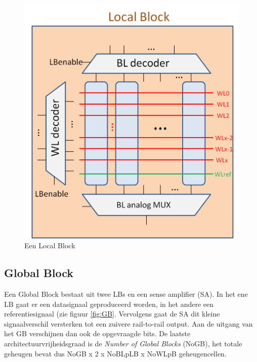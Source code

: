 \begin{figure}
  \centering
  \includegraphics[scale=0.3]{../fig/hfdstk-architecture-localblock.png}
  \caption{Een Local Block}
  \label{fig:LB}
\end{figure}

\subsection{Global Block}
Een Global Block bestaat uit twee LBs en een sense amplifier (SA). In het ene LB gaat er een datasignaal geproduceerd worden, in het andere een referentiesignaal (zie figuur \ref{fig:GB}. Vervolgens gaat de SA dit kleine signaalverschil versterken tot een zuivere rail-to-rail output.
Aan de uitgang van het GB verschijnen dan ook de opgevraagde bits.
De laatste architectuurvrijheidsgraad is de \emph{Number of Global Blocks} (NoGB), het totale geheugen bevat dus NoGB x 2 x NoBLpLB x NoWLpB geheugencellen.

